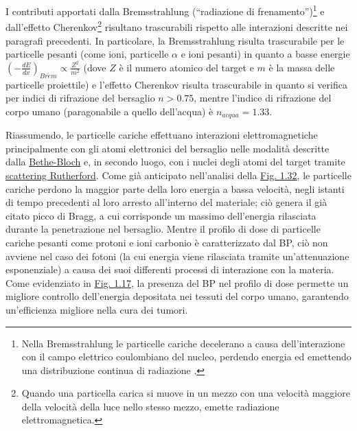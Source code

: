 \documentclass[12pt,a4paper,twoside]{report}
\begin{document}
	I contributi apportati dalla Bremsstrahlung (``radiazione di frenamento'')\footnote{Nella Bremsstrahlung le particelle cariche decelerano a causa dell'interazione con il campo elettrico coulombiano del nucleo, perdendo energia ed emettendo una distribuzione continua di radiazione \cite{testaNotes}.} e dall'effetto Cherenkov\footnote{Quando una particella carica si muove in un mezzo con una velocità maggiore della velocità della luce nello stesso mezzo, emette radiazione elettromagnetica.} risultano trascurabili rispetto alle interazioni descritte nei paragrafi precedenti. In particolare, la Bremsstrahlung risulta trascurabile per le particelle pesanti (come ioni, particelle $\alpha$ e ioni pesanti) in quanto a basse energie $\left(-\frac{dE}{dx}\right)_{Brem}\propto\frac{Z^2}{m^2}$ (dove $Z$ è il numero atomico del target e $m$ è la massa delle particelle proiettile) e l'effetto Cherenkov risulta trascurabile in quanto si verifica per indici di rifrazione del bersaglio $n>0.75$, mentre l'indice di rifrazione del corpo umano (paragonabile a quello dell'acqua) è $n_{acqua}=1.33$.
	
	Riassumendo, le particelle cariche effettuano interazioni elettromagnetiche principalmente con gli atomi elettronici del bersaglio nelle modalità descritte dalla \hyperref[par:bethe_bloch]{Bethe-Bloch} e, in secondo luogo, con i nuclei degli atomi del target tramite \hyperref[par:scattering_Rutherford]{scattering Rutherford}. Come già anticipato nell'analisi della \hyperref[fig:bethe_bloch]{Fig. 1.32}, le particelle cariche perdono la maggior parte della loro energia a bassa velocità, negli istanti di tempo precedenti al loro arresto all'interno del materiale; ciò genera il già citato picco di Bragg, a cui corrisponde un massimo dell'energia rilasciata durante la penetrazione nel bersaglio. Mentre il profilo di dose di particelle cariche pesanti come protoni e ioni carbonio è caratterizzato dal BP, ciò non avviene nel caso dei fotoni (la cui energia viene rilasciata tramite un'attenuazione esponenziale) a causa dei suoi differenti processi di interazione con la materia. Come evidenziato in \hyperref[fig:photon]{Fig. 1.17}, la presenza del BP nel profilo di dose permette un migliore controllo dell'energia depositata nei tessuti del corpo umano, garantendo un'efficienza migliore nella cura dei tumori.
	
\end{document}
